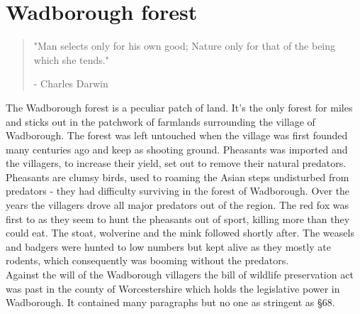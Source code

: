 \documentclass[smalldemyvopaper,11pt,twoside,onecolumn,openright,extrafontsizes]{memoir}
\begin{document}





\mainmatter
\chapter{Wadborough forest}
\vspace{-1.3cm}
\begin{localsize}{10}
	\begin{quote}
		"Man selects only for his own good; Nature only for that of the being which she tends."
		\begin{flushright}- Charles Darwin\end{flushright}
	\end{quote} 
\end{localsize}
\vspace{1cm}

The Wadborough forest is a peculiar patch of land. It's the only forest for miles and sticks out in the patchwork of farmlands surrounding the village of Wadborough. The forest was left untouched when the village was first founded many centuries ago and keep as shooting ground. Pheasants was imported and the villagers, to increase their yield, set out to remove their natural predators. \\

Pheasants are clumsy birds, used to roaming the Asian steps undisturbed from predators - they had difficulty surviving in the forest of Wadborough. Over the years the villagers drove all major predators out of the region. The red fox was first to as they seem to hunt the pheasants out of sport, killing more than they could eat. The stoat, wolverine and the mink followed shortly after. The weasels and badgers were hunted to low numbers but kept alive as they mostly ate rodents, which consequently was booming without the predators. \\

Against the will of the Wadborough villagers the bill of wildlife preservation act was past in the county of Worcestershire which holds the legislative power in Wadborough. It contained many paragraphs but no one as stringent as §68.
\end{document}
